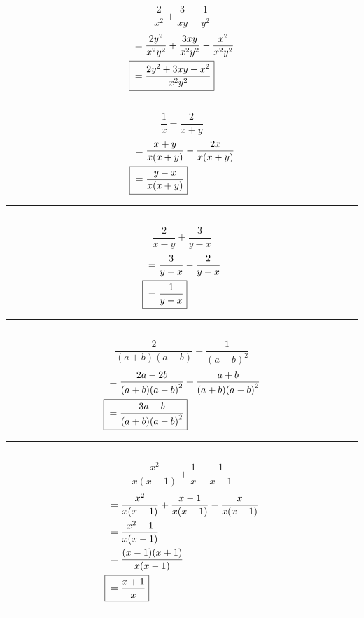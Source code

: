 	\subsection{}
		\[\frac{2}{x^2} + \frac{3}{xy} - \frac{1}{y^2}\]
		\begin{align*}
			&= \frac{2y^2}{x^2y^2} + \frac{3xy}{x^2y^2} - \frac{x^2}{x^2y^2} \\
			\Aboxed{{} &= \frac{2y^2 + 3xy - x^2}{x^2y^2}}
		\end{align*}

	\subsection{}
		\[\frac{1}{x} - \frac{2}{x + y}\]
		\begin{align*}
			&= \frac{x + y}{x(x + y)} - \frac{2x}{x(x + y)} \\
			\Aboxed{{} &= \frac{y - x}{x(x + y)}}
		\end{align*}
		\hrule{}

	\subsection{}
		\[\frac{2}{x - y} + \frac{3}{y - x}\]
		\begin{align*}
			&= \frac{3}{y - x} - \frac{2}{y - x} \\
			\Aboxed{{} &= \frac{1}{y - x}}
		\end{align*}
		\hrule{}

	\subsection{}
		\[\frac{2}{(a + b)(a - b)} + \frac{1}{{(a - b)}^2}\]
		\begin{align*}
			&= \frac{2a - 2b}{(a + b){(a - b)}^2} + \frac{a + b}{(a + b){(a - b)}^2} \\
			\Aboxed{{} &= \frac{3a - b}{(a + b){(a - b)}^2}}
		\end{align*}
		\hrule{}

	\subsection{}
		\[\frac{x^2}{x(x - 1)} + \frac{1}{x} - \frac{1}{x - 1}\]
		\begin{align*}
			&= \frac{x^2}{x(x - 1)} + \frac{x - 1}{x(x - 1)} - \frac{x}{x(x - 1)} \\
			&= \frac{x^2 - 1}{x(x - 1)} \\
			&= \frac{(x - 1)(x + 1)}{x(x - 1)} \\
			\Aboxed{{} &= \frac{x + 1}{x}}
		\end{align*}
		\hrule{}

